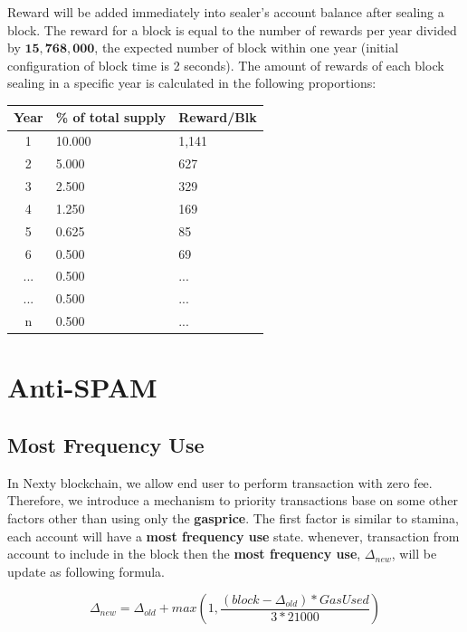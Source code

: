 \documentclass[12pt,oneside]{amsart}
\begin{document}
\begin{multicols}{2}
Reward will be added immediately into sealer’s account balance after sealing a block. The reward for a block is equal to the number of rewards per year divided by $\mathbf{15,768,000}$, the expected number of block within one year (initial configuration of block time is 2 seconds). The amount of rewards of each block sealing in a specific year is calculated in the following proportions:

\begin{center}
  \begin{tabular}{c | l | l}
    \hline
    Year &  \% of total supply & Reward/Blk\\ 
    \hline
    1 & 10.000 & 1,141\\ 
    2 & 5.000 & 627 \\ 
    3 & 2.500 & 329 \\ 
    4 & 1.250 & 169 \\ 
    5 & 0.625 & 85 \\
    6 & 0.500 & 69 \\
    ... & 0.500 & ... \\
    ... & 0.500 & ... \\ 
    n & 0.500 & ... \\
    \hline
  \end{tabular}
\end{center}

\section{Anti-SPAM}\label{sec:spam}

\subsection{Most Frequency Use}\label{sec:mfu}

In Nexty blockchain, we allow end user to perform transaction with zero fee. Therefore, we introduce a mechanism to priority transactions base on some other factors other than using only the \textbf{gasprice}. The first factor is similar to stamina, each account will have a \textbf{most frequency use} state. whenever, transaction from account to include in the block then the \textbf{most frequency use}, ${\Delta_{new}}$, will be update as following formula.

\begin{equation}
	{\Delta_{new}}  = {\Delta_{old}} + max(1, \frac{(block - {\Delta_{old}}) * GasUsed}{3 * 21000})
\end{equation}


\end{multicols}
\end{document}
